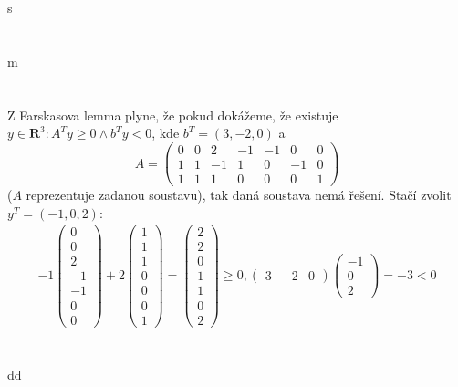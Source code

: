 \documentclass[12pt, a4paper]{article}
\begin{document}
\section{}
s

\section{}
m

\section{}
Z Farskasova lemma plyne, že pokud dokážeme, že existuje $y \in \mathbf{R}^3: A^T y \geq 0 \land b^T y < 0$, kde $b^T = (3, -2, 0)$ a 
\[
A = \begin{pmatrix}
0 & 0 & 2 & -1 & -1 & 0 & 0\\
1 & 1 & -1 & 1 & 0 & -1 & 0 \\
1 & 1 & 1 & 0 & 0 & 0 & 1
\end{pmatrix}
\]
($A$ reprezentuje zadanou soustavu), tak daná soustava nemá řešení. Stačí zvolit\\
$y^T = (-1, 0, 2)$:
\begin{gather*}
-1\begin{pmatrix}
0\\
0\\
2\\
-1\\
-1\\
0\\
0
\end{pmatrix} + 
2\begin{pmatrix}
1\\
1\\
1\\
0\\
0\\
0\\
1
\end{pmatrix} = 
\begin{pmatrix}
2\\
2\\
0\\
1\\
1\\
0\\
2
\end{pmatrix} \geq 0, \begin{pmatrix}3 & -2 & 0\end{pmatrix} \begin{pmatrix}
-1\\
0\\
2
\end{pmatrix} = -3 < 0
\end{gather*}

\section{}
dd
\end{document}
